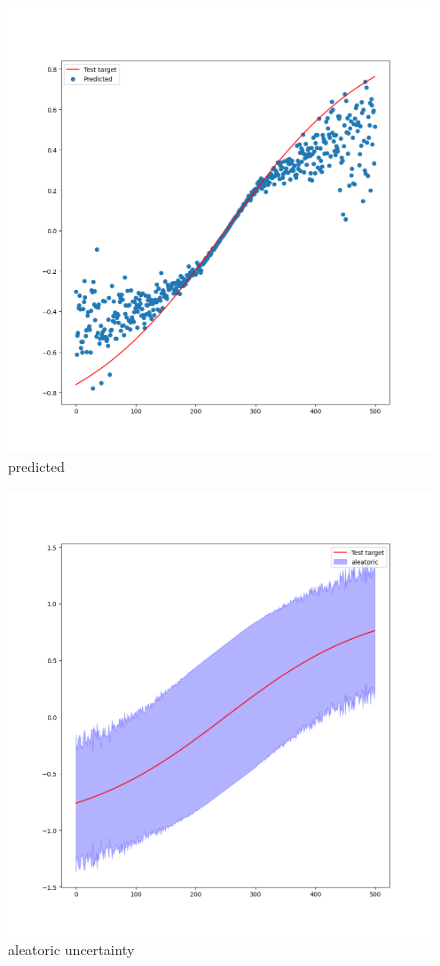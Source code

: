 \documentclass[11pt]{article}
\begin{document}
\begin{figure}[htbp]
\centering
\includegraphics[width=.9\linewidth]{./predicted.png}
\caption{predicted}
\end{figure}
\begin{figure}[htbp]
\centering
\includegraphics[width=.9\linewidth]{./aleatoric.png}
\caption{aleatoric uncertainty}
\end{figure}
\end{document}
